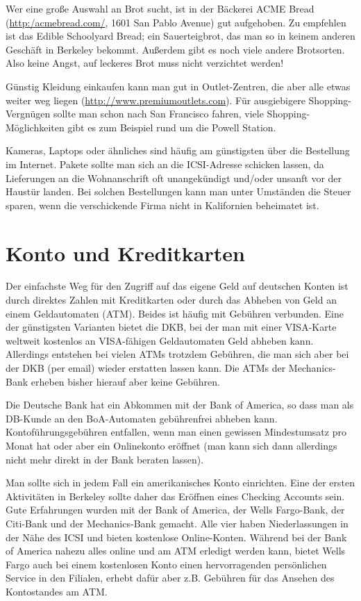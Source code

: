 \documentclass[a4paper]{scrreprt}
\begin{document}
Wer eine große Auswahl an Brot sucht, ist in der Bäckerei ACME Bread
(\url{http:/acmebread.com/}, 1601 San Pablo Avenue) gut aufgehoben. Zu
empfehlen ist das Edible Schoolyard Bread; ein Sauerteigbrot, das man
so in keinem anderen Geschäft in Berkeley bekommt. Außerdem gibt es
noch viele andere Brotsorten. Also keine Angst, auf
leckeres Brot muss nicht verzichtet werden! 

Günstig Kleidung einkaufen kann man gut in Outlet-Zentren, die aber
alle etwas weiter weg liegen
(\url{http://www.premiumoutlets.com}). Für ausgiebigere
Shopping-Vergnügen sollte man schon nach San Francisco fahren, viele
Shopping-Möglichkeiten gibt es zum Beispiel rund um die Powell
Station.

Kameras, Laptops oder ähnliches sind häufig am günstigsten über die
Bestellung im Internet. Pakete sollte man sich an die ICSI-Adresse
schicken lassen, da Lieferungen an die Wohnanschrift oft unangekündigt
und/oder unsanft vor der Haustür landen. Bei solchen Bestellungen kann
man unter Umständen die Steuer sparen, wenn die verschickende Firma
nicht in Kalifornien beheimatet ist.


\section{Konto und Kreditkarten}

Der einfachste Weg für den Zugriff auf das eigene Geld auf deutschen Konten ist durch direktes Zahlen mit Kreditkarten oder durch das Abheben von Geld an einem Geldautomaten (ATM). Beides ist häufig mit Gebühren verbunden. Eine der günstigsten Varianten bietet die DKB, bei der man mit einer VISA-Karte weltweit kostenlos an VISA-fähigen Geldautomaten Geld abheben kann. Allerdings entstehen bei vielen ATMs trotzdem Gebühren, die man sich aber bei der DKB (per email) wieder erstatten lassen kann. Die ATMs der Mechanics-Bank erheben bisher hierauf aber keine Gebühren.

Die Deutsche Bank hat ein Abkommen mit der Bank of America, so dass man als DB-Kunde an den BoA-Automaten gebührenfrei abheben kann. Kontoführungsgebühren entfallen, wenn man einen gewissen Mindestumsatz pro Monat hat oder aber ein Onlinekonto eröffnet (man kann sich dann allerdings nicht mehr direkt in der Bank beraten lassen).

Man sollte sich in jedem Fall ein amerikanisches Konto einrichten. Eine der ersten Aktivitäten in Berkeley sollte daher das Eröffnen eines Checking Accounts sein. Gute Erfahrungen wurden mit der Bank of America, der Wells Fargo-Bank, der Citi-Bank und der Mechanics-Bank gemacht. Alle vier haben Niederlassungen in der Nähe des ICSI und bieten kostenlose Online-Konten. Während bei der Bank of America nahezu alles online und am ATM erledigt werden kann, bietet Wells Fargo auch bei einem kostenlosen Konto einen hervorragenden persönlichen Service in den Filialen, erhebt dafür aber z.B. Gebühren für das Ansehen des Kontostandes am ATM.
\end{document}
